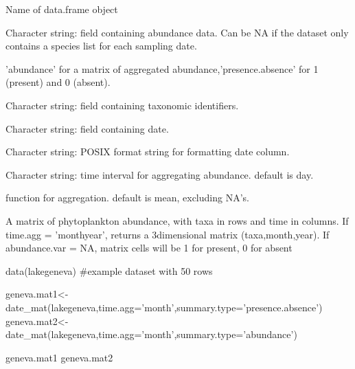 \documentclass[a4paper]{book}
\begin{document}
\begin{Arguments}
\begin{ldescription}
\item[\code{phyto.df}] Name of data.frame object

\item[\code{abundance.var}] Character string: field containing abundance data.
Can be NA if the dataset only contains a species list for each sampling date.

\item[\code{summary.type}] 'abundance' for a matrix of aggregated abundance,'presence.absence'
for 1 (present) and 0 (absent).

\item[\code{taxa.name}] Character string: field containing taxonomic identifiers.

\item[\code{date.name}] Character string: field containing date.

\item[\code{format}] Character string: POSIX format string for formatting date column.

\item[\code{time.agg}] Character string: time interval for aggregating abundance. default is day.

\item[\code{fun}] function for aggregation. default is mean, excluding NA's.
\end{ldescription}
\end{Arguments}
%
\begin{Value}
A matrix of phytoplankton abundance, with taxa in rows and time in columns.
If time.agg = 'monthyear', returns a 3dimensional matrix (taxa,month,year).
If abundance.var = NA, matrix cells will be 1 for present, 0 for absent
\end{Value}
%
\begin{Examples}
\begin{ExampleCode}
data(lakegeneva)
#example dataset with 50 rows

geneva.mat1<-date_mat(lakegeneva,time.agg='month',summary.type='presence.absence')
geneva.mat2<-date_mat(lakegeneva,time.agg='month',summary.type='abundance')

geneva.mat1
geneva.mat2
\end{ExampleCode}
\end{Examples}
\end{document}
